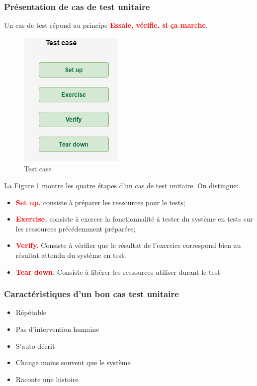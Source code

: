 \documentclass[french]{article}
\theoremstyle{definition}
\begin{document}
\subsubsection{Présentation de cas de test unitaire}
Un cas de test  répond au principe \textbf{\textcolor{red}{Essaie, vérifie, si ça marche}}.
 \begin{figure}[!htp]
  \begin{center}
  \includegraphics[width=0.5\linewidth]{./testcase.png}
  \caption{Test case}
  \label{fig:testcase}
  \end{center}
\end{figure}
La Figure \ref{fig:testcase}   montre les quatre étapes d'un cas de test unitaire. On distingue:
\begin{itemize}
    \item \textbf{\textcolor{red}{Set up.}} consiste à  préparer les ressources pour le tests;
    \item \textbf{\textcolor{red}{Exercise.}} consiste à exercer la fonctionnalité à tester du  système en tests  sur les ressources précédemment préparées;
    \item \textbf{\textcolor{red}{Verify.}} Consiste à vérifier que le résultat de l'exercice correspond bien au résultat attendu du système en test;
    \item \textbf{\textcolor{red}{Tear down.}} Consiste à libérer les ressources utiliser durant le test
\end{itemize}

\subsubsection{Caractéristiques d'un bon cas test unitaire}
\begin{itemize}
    \item Répétable
\item Pas d'intervention humaine
\item S'auto-décrit
\item Change moins souvent que le système
\item Raconte une histoire
\end{itemize}
\end{document}
